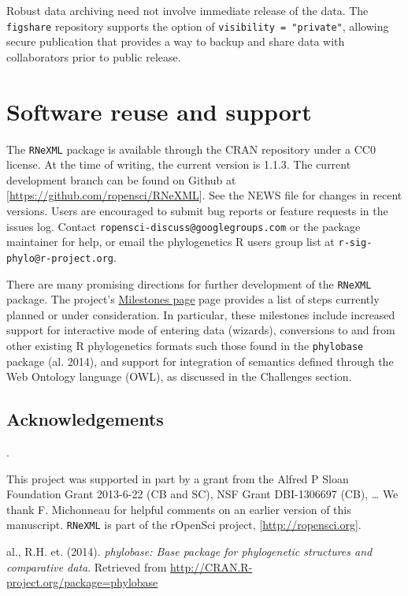 \documentclass[author-year, review, 11pt]{components/elsarticle} %
\begin{document}
Robust data archiving need not involve immediate release of the data.
The \texttt{figshare} repository supports the option of
\texttt{visibility = "private"}, allowing secure publication that
provides a way to backup and share data with collaborators prior to
public release.

\section{Software reuse and support}\label{software-reuse-and-support}

The \texttt{RNeXML} package is available through the CRAN repository
under a CC0 license. At the time of writing, the current version is
1.1.3. The current development branch can be found on Github at
{[}\url{https://github.com/ropensci/RNeXML}{]}. See the NEWS file for
changes in recent versions. Users are encouraged to submit bug reports
or feature requests in the issues log. Contact
\texttt{ropensci-discuss@googlegroups.com} or the package maintainer for
help, or email the phylogenetics R users group list at
\texttt{r-sig-phylo@r-project.org}.

There are many promising directions for further development of the
\texttt{RNeXML} package. The project's
\href{https://github.com/ropensci/RNeXML/issues/milestones}{Milestones
page} page provides a list of steps currently planned or under
consideration. In particular, these milestones include increased support
for interactive mode of entering data (wizards), conversions to and from
other existing R phylogenetics formats such those found in the
\texttt{phylobase} package (al. 2014), and support for integration of
semantics defined through the Web Ontology language (OWL), as discussed
in the Challenges section.

\subsection{Acknowledgements}\label{acknowledgements}

.

This project was supported in part by a grant from the Alfred P Sloan
Foundation Grant 2013-6-22 (CB and SC), NSF Grant DBI-1306697 (CB),
\ldots{} We thank F. Michonneau for helpful comments on an earlier
version of this manuscript. \texttt{RNeXML} is part of the rOpenSci
project, {[}\url{http://ropensci.org}{]}.

al., R.H. et. (2014). \emph{phylobase: Base package for phylogenetic
structures and comparative data}. Retrieved from
\url{http://CRAN.R-project.org/package=phylobase}
\end{document}
